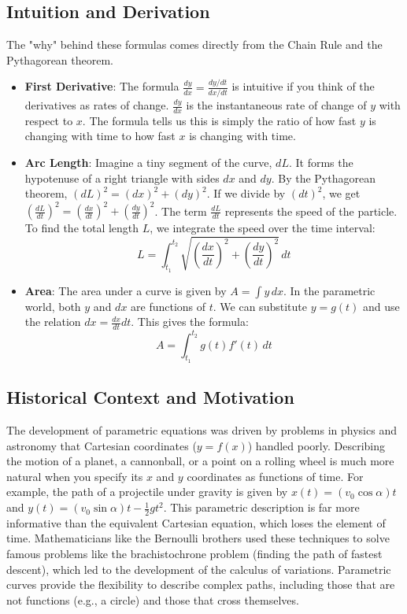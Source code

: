 \documentclass{article}
\begin{document}
\subsection{Intuition and Derivation}
The "why" behind these formulas comes directly from the Chain Rule and the Pythagorean theorem.

\begin{itemize}
    \item \textbf{First Derivative}: The formula $\frac{dy}{dx} = \frac{dy/dt}{dx/dt}$ is intuitive if you think of the derivatives as rates of change. $\frac{dy}{dx}$ is the instantaneous rate of change of $y$ with respect to $x$. The formula tells us this is simply the ratio of how fast $y$ is changing with time to how fast $x$ is changing with time.
    \item \textbf{Arc Length}: Imagine a tiny segment of the curve, $dL$. It forms the hypotenuse of a right triangle with sides $dx$ and $dy$. By the Pythagorean theorem, $(dL)^2 = (dx)^2 + (dy)^2$. If we divide by $(dt)^2$, we get $(\frac{dL}{dt})^2 = (\frac{dx}{dt})^2 + (\frac{dy}{dt})^2$. The term $\frac{dL}{dt}$ represents the speed of the particle. To find the total length $L$, we integrate the speed over the time interval:
    \[ L = \int_{t_1}^{t_2} \sqrt{\left(\frac{dx}{dt}\right)^2 + \left(\frac{dy}{dt}\right)^2} \, dt \]
    \item \textbf{Area}: The area under a curve is given by $A = \int y \, dx$. In the parametric world, both $y$ and $dx$ are functions of $t$. We can substitute $y = g(t)$ and use the relation $dx = \frac{dx}{dt} dt$. This gives the formula:
    \[ A = \int_{t_1}^{t_2} g(t) f'(t) \, dt \]
\end{itemize}

\subsection{Historical Context and Motivation}
The development of parametric equations was driven by problems in physics and astronomy that Cartesian coordinates ($y=f(x)$) handled poorly. Describing the motion of a planet, a cannonball, or a point on a rolling wheel is much more natural when you specify its $x$ and $y$ coordinates as functions of time. For example, the path of a projectile under gravity is given by $x(t) = (v_0 \cos \alpha)t$ and $y(t) = (v_0 \sin \alpha)t - \frac{1}{2}gt^2$. This parametric description is far more informative than the equivalent Cartesian equation, which loses the element of time.
Mathematicians like the Bernoulli brothers used these techniques to solve famous problems like the brachistochrone problem (finding the path of fastest descent), which led to the development of the calculus of variations. Parametric curves provide the flexibility to describe complex paths, including those that are not functions (e.g., a circle) and those that cross themselves.
\end{document}
